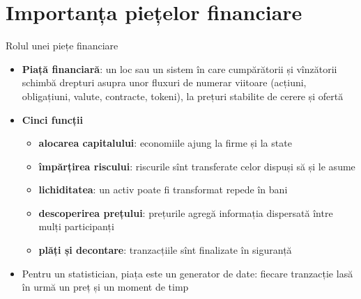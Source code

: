 \section{Importanța piețelor financiare}

\begin{frame}{Rolul unei piețe financiare}
\itemsize{\small}
\begin{itemize}
    \item \textbf{Piață financiară}: un loc sau un sistem în care cumpărătorii și vînzătorii schimbă drepturi asupra unor fluxuri de numerar viitoare (acțiuni, obligațiuni, valute, contracte, tokeni), la prețuri stabilite de cerere și ofertă
    \item \textbf{Cinci funcții}
    \begin{itemize}
        \item \textbf{alocarea capitalului}: economiile ajung la firme și la state
        \item \textbf{împărțirea riscului}: riscurile sînt transferate celor dispuși să și le asume
        \item \textbf{lichiditatea}: un activ poate fi transformat repede în bani
        \item \textbf{descoperirea prețului}: prețurile agregă informația dispersată între mulți participanți
        \item \textbf{plăți și decontare}: tranzacțiile sînt finalizate în siguranță
    \end{itemize}
    \item Pentru un statistician, piața este un generator de date: fiecare tranzacție lasă în urmă un preț și un moment de timp
\end{itemize}
\end{frame}

